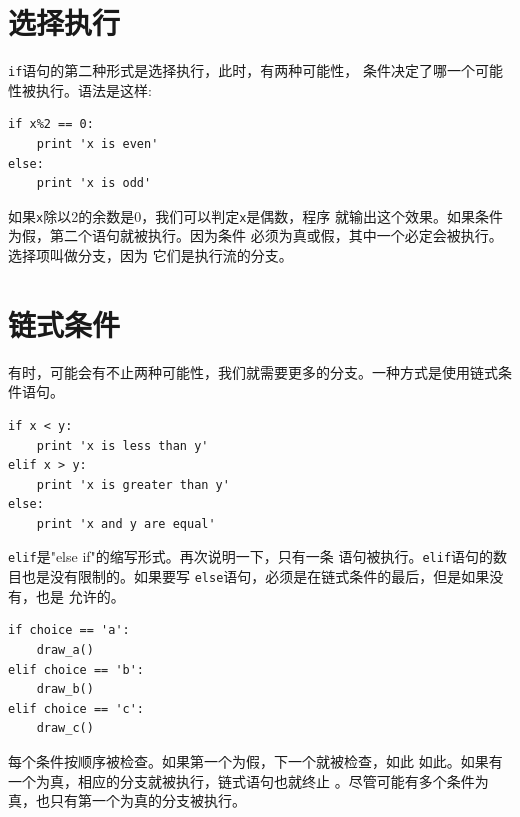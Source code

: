 {\section{选择执行}
\label {alternative execution}


{\tt if}语句的第二种形式是选择执行，此时，有两种可能性，
条件决定了哪一个可能性被执行。语法是这样:

\beforeverb
\begin{verbatim}
if x%2 == 0:
    print 'x is even'
else:
    print 'x is odd'
\end{verbatim}
\afterverb

如果{\tt x}除以2的余数是0，我们可以判定{\tt x}是偶数，程序
就输出这个效果。如果条件为假，第二个语句就被执行。因为条件
必须为真或假，其中一个必定会被执行。选择项叫做分支，因为
它们是执行流的分支。



\section{链式条件}

有时，可能会有不止两种可能性，我们就需要更多的分支。一种方式是使用链式条件语句。

\beforeverb
\begin{verbatim}
if x < y:
    print 'x is less than y'
elif x > y:
    print 'x is greater than y'
else:
    print 'x and y are equal'
\end{verbatim}
\afterverb

{\tt elif}是"else if"的缩写形式。再次说明一下，只有一条
语句被执行。{\tt elif}语句的数目也是没有限制的。如果要写
{\tt else}语句，必须是在链式条件的最后，但是如果没有，也是
允许的。


\beforeverb
\begin{verbatim}
if choice == 'a':
    draw_a()
elif choice == 'b':
    draw_b()
elif choice == 'c':
    draw_c()
\end{verbatim}
\afterverb

每个条件按顺序被检查。如果第一个为假，下一个就被检查，如此
如此。如果有一个为真，相应的分支就被执行，链式语句也就终止
。尽管可能有多个条件为真，也只有第一个为真的分支被执行。\\


}
